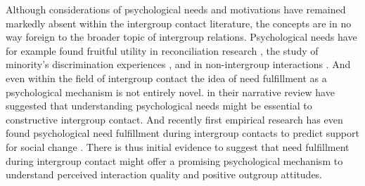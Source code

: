\documentclass[man, 12pt, a4paper]{apa7}
\theoremstyle{break}
\theoremstyle{plain}
\begin{document}


Although considerations of psychological needs and motivations have remained markedly absent within the intergroup contact literature, the concepts are in no way foreign to the broader topic of intergroup relations. Psychological needs have for example found fruitful utility in reconciliation research \citep[][]{Shnabel2008}, the study of minority's discrimination experiences \citep[][]{Celebi2017}, and in non-intergroup interactions \citep[][]{Downie2008}. 
And even within the field of intergroup contact the idea of need fulfillment as a psychological mechanism is not entirely novel. \citet{Dovidio2017} in their narrative review have suggested that understanding psychological needs might be essential to constructive intergroup contact. And recently first empirical research has even found psychological need fulfillment during intergroup contacts to predict support for social change \citep[][]{Hassler2021}. There is thus initial evidence to suggest that need fulfillment during intergroup contact might offer a promising psychological mechanism to understand perceived interaction quality and positive outgroup attitudes. 
\end{document}
